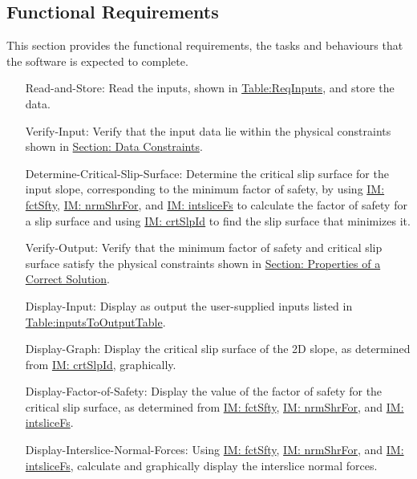 \documentclass[12pt]{article}
\begin{document}
\subsection{Functional Requirements}
\label{Sec:FRs}
This section provides the functional requirements, the tasks and behaviours that the software is expected to complete.
\begin{itemize}
\item[Read-and-Store:\phantomsection\label{readAndStore}]Read the inputs, shown in \hyperref[Table:ReqInputs]{Table:ReqInputs}, and store the data.
\item[Verify-Input:\phantomsection\label{verifyInput}]Verify that the input data lie within the physical constraints shown in \hyperref[Sec:DataConstraints]{Section: Data Constraints}.
\item[Determine-Critical-Slip-Surface:\phantomsection\label{determineCritSlip}]Determine the critical slip surface for the input slope, corresponding to the minimum factor of safety, by using \hyperref[IM:fctSfty]{IM: fctSfty}, \hyperref[IM:nrmShrFor]{IM: nrmShrFor}, and \hyperref[IM:intsliceFs]{IM: intsliceFs} to calculate the factor of safety for a slip surface and using \hyperref[IM:crtSlpId]{IM: crtSlpId} to find the slip surface that minimizes it.
\item[Verify-Output:\phantomsection\label{verifyOutput}]Verify that the minimum factor of safety and critical slip surface satisfy the physical constraints shown in \hyperref[Sec:CorSolProps]{Section: Properties of a Correct Solution}.
\item[Display-Input:\phantomsection\label{displayInput}]Display as output the user-supplied inputs listed in \hyperref[Table:inputsToOutputTable]{Table:inputsToOutputTable}.
\item[Display-Graph:\phantomsection\label{displayGraph}]Display the critical slip surface of the 2D slope, as determined from \hyperref[IM:crtSlpId]{IM: crtSlpId}, graphically.
\item[Display-Factor-of-Safety:\phantomsection\label{displayFS}]Display the value of the factor of safety for the critical slip surface, as determined from \hyperref[IM:fctSfty]{IM: fctSfty}, \hyperref[IM:nrmShrFor]{IM: nrmShrFor}, and \hyperref[IM:intsliceFs]{IM: intsliceFs}.
\item[Display-Interslice-Normal-Forces:\phantomsection\label{displayNormal}]Using \hyperref[IM:fctSfty]{IM: fctSfty}, \hyperref[IM:nrmShrFor]{IM: nrmShrFor}, and \hyperref[IM:intsliceFs]{IM: intsliceFs}, calculate and graphically display the interslice normal forces.

\end{itemize}
\end{document}
